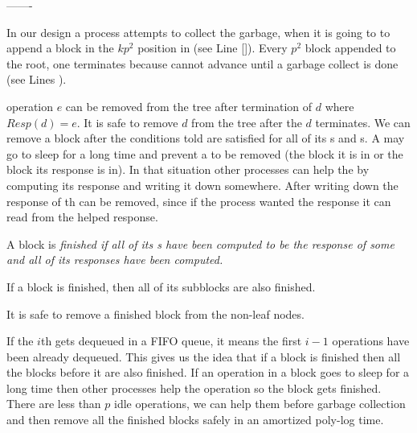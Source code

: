 -------

In our design a process attempts to collect the garbage, when it is going to to append a block in the $kp^2$ position in  (see Line \ref{}). Every $p^2$  block appended to the root, one  terminates because  cannot advance until a  garbage collect is done (see Lines ).

%

 operation $e$ can be removed from the tree after termination of  $d$ where $Resp(d)=e$. It is safe to remove  $d$ from the tree after the $d$ terminates. We can remove a block after the conditions told are satisfied for all of its s and s. A  may go to sleep for a long time and prevent a  to be removed (the block it is in or the block its response is in). In that situation other processes can help the  by computing its response and writing it down somewhere. After writing down the response of th  can be removed, since if the process wanted the response it can read from the helped response.

\begin{definition}
A block  is \it{finished} if all of its s have been computed to be the response of some  and all of its  responses have been computed.  
\end{definition}

\begin{corollary}
If a block is finished, then all of its subblocks are also finished.  
\end{corollary}

\begin{lemma}
It is safe to remove a finished block from the non-leaf nodes.
\end{lemma}

If the $i$th  gets dequeued in a FIFO queue, it means the first $i-1$  operations have been already dequeued. This gives us the idea that if a block is finished then all the blocks before it are also finished. If an operation in a block goes to sleep for a long time then other processes help the operation so the block gets finished. There are less than $p$ idle operations, we can help them before garbage collection and then remove all the finished blocks safely in an amortized poly-log time.

